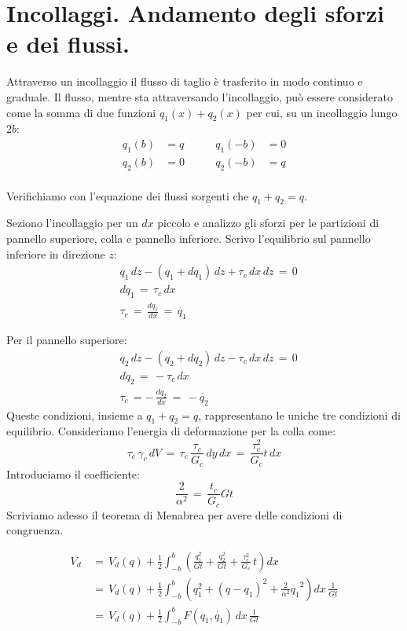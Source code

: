 \section{Incollaggi. Andamento degli sforzi e dei flussi.}


Attraverso un incollaggio il flusso di taglio è trasferito in modo continuo e graduale. Il flusso, mentre sta attraversando l'incollaggio, può essere considerato come la somma di due funzioni $q_1(x)+q_2(x)$ per cui, su un incollaggio lungo $2b$:
\begin{align*}
    q_1(b) &= q\qquad &q_1(-b)&=0\\
     q_2(b) &= 0\qquad &q_2(-b)&=q\\
\end{align*}

Verifichiamo con l'equazione dei flussi sorgenti che $q_1+q_2=q$.

Seziono l'incollaggio per un $dx$ piccolo e analizzo gli sforzi per le partizioni di pannello superiore, colla e pannello inferiore.
Scrivo l'equilibrio sul pannello inferiore in direzione $z$:
\begin{align*}
   & q_1\,dz - (q_1+dq_1)\,dz+\tau_c\,dx\,dz\,=\,0\\
    &dq_1\,=\,\tau_c\,dx\\
    &\tau_c\,=\, \frac{dq_1}{dx}\,=\,\dot{q_1}
\end{align*}

Per il pannello superiore:
\begin{align*}
   & q_2\,dz - (q_2+dq_2)\,dz-\tau_c\,dx\,dz\,=\,0\\
    &dq_2\,=\,-\tau_c\,dx\\
    &\tau_c\,=-\, \frac{dq_2}{dx}\,=\,-\dot{q_2}
\end{align*}
Queste condizioni, insieme a  $q_1+q_2=q$, rappresentano le uniche tre condizioni di equilibrio.
Consideriamo l'energia di deformazione per la colla come:
\begin{equation*}
    \tau_c\,\gamma_c\,dV\,=\,\tau_c\,\frac{\tau_c}{G_c}\,dy\,dx\,=\,\frac{\tau_c^2}{G_c} t \,dx
\end{equation*}
Introduciamo il coefficiente:
\begin{equation*}
    \frac{2}{\alpha^2}\,=\,\frac{t_c}{G_c}Gt
\end{equation*}
Scriviamo adesso il teorema di Menabrea per avere delle condizioni di congruenza.


\begin{align*}
    V_{d}\,&=\,V_d(q) +\frac{1}{2} \int_{-b}^b\left( \frac{q_1^2}{Gt}  + \frac{q_2^2}{Gt} + \frac{\tau_c^2}{G_c}\,t  \right)dx\\
   &=\,V_d(q) +\frac{1}{2} \int_{-b}^b\left( q_1^2+ (q-q_1)^2+ \frac{2}{\alpha^2} \dot{q_1}^2   \right)dx\, \frac{1}{Gt}\\
     &=\,V_d(q) +\frac{1}{2} \int_{-b}^b  F(q_1, \dot{q_1})\, dx\, \frac{1}{Gt}\\
\end{align*}

